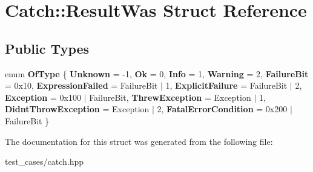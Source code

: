 \hypertarget{structCatch_1_1ResultWas}{}\section{Catch\+:\+:Result\+Was Struct Reference}
\label{structCatch_1_1ResultWas}
\subsection*{Public Types}
\begin{DoxyCompactItemize}
\item 
\mbox{\label{structCatch_1_1ResultWas_a624e1ee3661fcf6094ceef1f654601ef}} 
enum {\bfseries Of\+Type} \{ \newline
{\bfseries Unknown} = -\/1, 
{\bfseries Ok} = 0, 
{\bfseries Info} = 1, 
{\bfseries Warning} = 2, 
\newline
{\bfseries Failure\+Bit} = 0x10, 
{\bfseries Expression\+Failed} = Failure\+Bit $\vert$ 1, 
{\bfseries Explicit\+Failure} = Failure\+Bit $\vert$ 2, 
{\bfseries Exception} = 0x100 $\vert$ Failure\+Bit, 
\newline
{\bfseries Threw\+Exception} = Exception $\vert$ 1, 
{\bfseries Didnt\+Throw\+Exception} = Exception $\vert$ 2, 
{\bfseries Fatal\+Error\+Condition} = 0x200 $\vert$ Failure\+Bit
 \}
\end{DoxyCompactItemize}


The documentation for this struct was generated from the following file\+:\begin{DoxyCompactItemize}
\item 
test\+\_\+cases/catch.\+hpp\end{DoxyCompactItemize}
